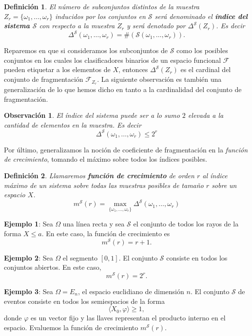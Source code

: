 \documentclass{report}
\newtheorem{dfn}{Definición}[section]
\newtheorem{obs}{Observación}[section]
\begin{document}
\begin{dfn}
El número de subconjuntos distintos de la muestra \( Z_r = \{\omega_1, \dots, \omega_r\} \) 
inducidos por los conjuntos en \( \mathcal{S} \) será denominado el \textbf{índice 
del sistema \( \mathcal{S} \)} con respecto a la muestra \( Z_r \) 
y será denotado por $\Delta^{\mathcal{S}}(Z_r)$. Es decir
\[
\Delta^{\mathcal{S}}(\omega_1, \dots, \omega_r) = \#\left(\mathcal{S}(\omega_1, \dots, \omega_r)\right).
\]
\end{dfn}

Reparemos en que si consideramos los subconjuntos de $\mathcal{S}$ como los posibles conjuntos en
los cuales los clasificadores binarios de un espacio funcional $\mathcal{F}$ pueden etiquetar a los
elementos de $X$, entonces $\Delta^{\mathcal{S}}(Z_r)$ es el cardinal del conjunto de fragmentación $\mathcal{F}_{Z_r}$.
La siguiente observación es también una generalización
de lo que hemos dicho en tanto a la cardinalidad del conjunto de fragmentación.\newline


\begin{obs} El índice del sistema puede ser a lo sumo $2$ elevada a la cantidad de elementos en la muestra. Es decir
\[
    \Delta^{\mathcal{S}}(\omega_1, \dots, \omega_r) \leq 2^r
\]
\end{obs}

Por último, generalizamos la noción de coeficiente de fragmentación en la \textit{función de crecimiento},
tomando el máximo sobre todos los índices posibles.\newline

\begin{dfn}
    Llamaremos \textbf{función de crecimiento} de orden $r$ al índice máximo de un sistema sobre todas las muestras
    posibles de tamaño $r$ sobre un espacio $X$. 
    \[
    m^{\mathcal{S}}(r) = \max_{\{\omega_1,\dots,\omega_r\}}\Delta^{\mathcal{S}}(\omega_1,\dots,\omega_r)
    \]
\end{dfn}
\bigskip

\textbf{Ejemplo 1}: Sea \( \Omega \) una línea recta y sea \( \mathcal{S} \) el conjunto 
de todos los rayos de la forma \( X \leq a \). En este caso, la función de crecimiento es  
\[
m^{\mathcal{S}}(r) = r + 1.
\]

\textbf{Ejemplo 2}: Sea \( \Omega \) el segmento \([0,1]\). El conjunto \( \mathcal{S} \) 
consiste en todos los conjuntos abiertos. En este caso,  
\[
m^{\mathcal{S}}(r) = 2^r.
\]

\textbf{Ejemplo 3}: Sea \( \Omega = E_n \), el espacio euclidiano de dimensión \( n \). 
El conjunto \( \mathcal{S} \) de eventos consiste en todos los semiespacios de la forma  
\[
\langle X_0, \varphi \rangle \geq 1,
\]  
donde \( \varphi \) es un vector fijo y las llaves representan el producto interno en el espacio.
 Evaluemos la función de crecimiento \( m^{\mathcal{S}}(r) \).\newline
\end{document}
